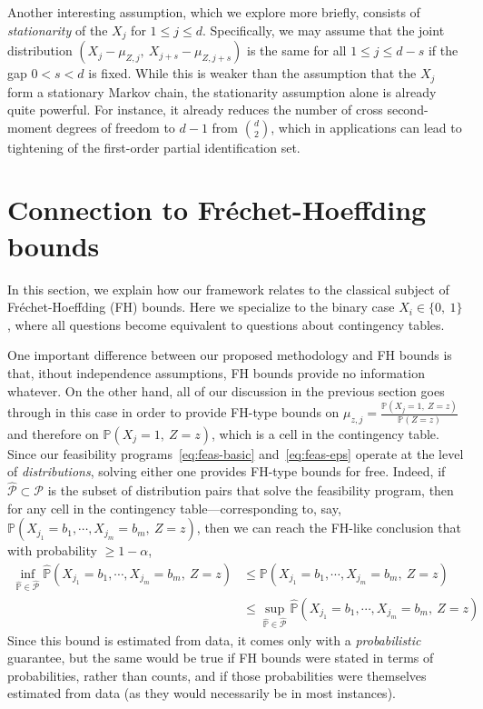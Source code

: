 \documentclass[11pt,twoside]{article}
\renewcommand{\P}{\mathbb{P}}
\newcommand{\bits}{\lbrace 0,~1\rbrace}
\newcommand{\dists}{\mathcal{P}}
\begin{document}
Another interesting assumption, which we explore more briefly, consists of \emph{stationarity} of the $X_{j}$ for $1 \leq j \leq d$. Specifically,
we may assume that the joint distribution $\left(X_{j} - \mu_{Z,j},~X_{j + s} - \mu_{Z,j+s}\right)$ is the same for all $1 \leq j \leq d - s$ if the gap $0 < s < d$ is fixed. While this is weaker than the assumption that the $X_{j}$ form a stationary Markov chain, the stationarity assumption alone is already quite powerful. For instance, it already reduces the number of cross second-moment degrees of freedom to $d - 1$ from $\binom{d}{2}$, which in applications can lead to tightening of the first-order partial identification set. 

\section{Connection to Fr\'{e}chet-Hoeffding bounds}

In this section, we explain how our framework relates to the classical subject of Fréchet-Hoeffding  (FH) bounds. Here we specialize to the binary case
$X_{i} \in \bits$, where all questions become equivalent to questions about contingency tables.

One important difference between our proposed methodology and FH bounds is that, ithout independence assumptions, FH bounds provide no information whatever. On the other hand, all of our discussion in the previous section goes through in this case in order to provide FH-type bounds on
$\mu_{z,j} = \frac{\P\left(X_{j} = 1,~Z = z\right)}{\P\left(Z = z\right)}$ and therefore on $\P\left(X_{j} = 1,~Z = z\right)$, which is a cell in the contingency table. Since our feasibility programs~\eqref{eq:feas-basic} and~\eqref{eq:feas-eps} operate at the level of {\it distributions}, solving either one provides FH-type bounds for free. Indeed, if $\hat{\dists} \subset \dists$ is the subset of distribution pairs that solve the feasibility program, then for any cell in the contingency table---corresponding to, say, $\P\left(X_{j_1} = b_{1}, \cdots, X_{j_m} = b_{m},~Z = z\right)$, then we can reach the FH-like conclusion that with probability $\geq 1 - \alpha$,
\begin{align*}
\inf_{\hat{\P} \in \hat{\dists}} \hat{\P}\left(X_{j_1} = b_{1}, \cdots, X_{j_m} = b_{m},~Z = z\right) & \leq \P\left(X_{j_1} = b_{1}, \cdots, X_{j_m} = b_{m},~Z = z\right) \\
& \leq \sup_{\hat{\P} \in \hat{\dists}} \hat{\P}\left(X_{j_1} = b_{1}, \cdots, X_{j_m} = b_{m},~Z = z\right)
\end{align*}
Since this bound is estimated from data, it comes only with a \emph{probabilistic} guarantee, but the same would be true if FH bounds were stated in terms of probabilities, rather than counts, and if those probabilities were themselves estimated from data (as they would necessarily be in most instances). 
\end{document}
